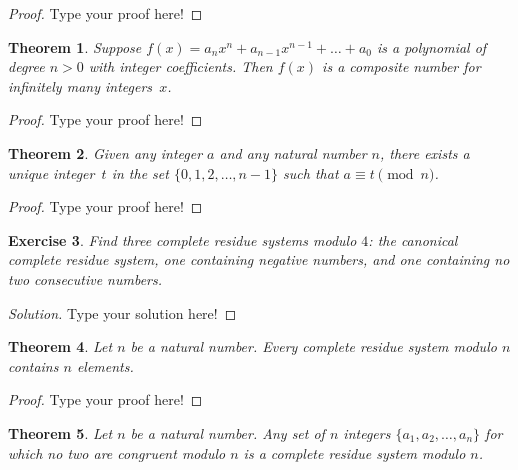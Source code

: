 \documentclass[11pt,leqno]{article}
\newtheorem{thm}{Theorem}[section]
\newtheorem{exer}[thm]{Exercise}
\theoremstyle{definition}
\begin{document}
\begin{proof}[Proof]
Type your proof here!
\end{proof}


\begin{thm}
Suppose $f(x) = a_nx^n + a_{n-1}x^{n-1} + \hdots + a_0$ is a
polynomial of degree $n > 0$ with integer coefficients.  Then $f(x)$
is a composite number for infinitely many integers~$x$.
\end{thm}

\begin{proof}[Proof]
Type your proof here!
\end{proof}

\begin{thm}Given any integer $a$ and any natural number $n$, there exists a unique integer~$t$ in the set $\{0, 1, 2, \hdots, n - 1\}$ such that $a \equiv t \pmod{n}$.
\end{thm}

\begin{proof}[Proof]
Type your proof here!
\end{proof}



\begin{exer}
Find three complete residue systems modulo $4$: the canonical
complete residue system, one containing negative numbers, and one
containing no two consecutive numbers.
\end{exer}

\begin{proof}[Solution]
Type your solution here!
\end{proof}


\begin{thm}
Let $n$ be a natural number. Every complete residue system modulo
$n$ contains $n$ elements.
\end{thm}

\begin{proof}[Proof]
Type your proof here!
\end{proof}


\begin{thm}
Let $n$ be a natural number. Any set of $n$ integers $\{a_1, a_2,
\hdots, a_n\}$ for which no two are congruent modulo $n$ is a
complete residue system modulo $n$.
\end{thm}
\end{document}
